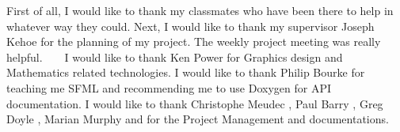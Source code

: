 First of all, I would like to thank my classmates who have been there to help in whatever way they could. Next, I would like to thank my supervisor Joseph Kehoe \cite{josephkehoe} for the planning of my project. The weekly project meeting was really helpful. ~\newline
~\newline
I would like to thank Ken Power \cite{kenpower} for Graphics design and Mathematics related technologies. I would like to thank Philip Bourke \cite{philipbourke} for teaching me S\+F\+M\+L and recommending me to use Doxygen for A\+P\+I documentation. I would like to thank Christophe Meudec \cite{christophemeudec}, Paul Barry \cite{paulbarry}, Greg Doyle \cite{gregdoyle}, Marian Murphy and \cite{marianmurphy} for the Project Management and documentations. ~\newline
~\newline
